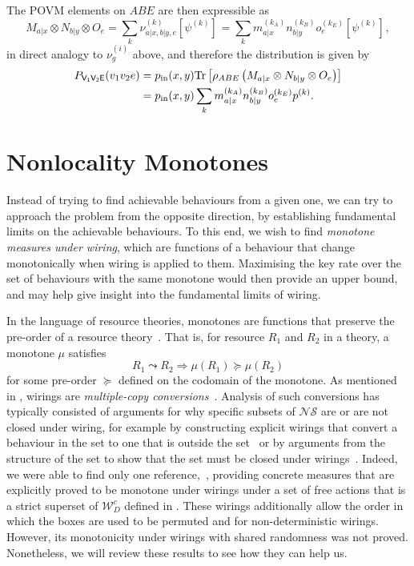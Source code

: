 \documentclass[10pt, a4paper]{article}
\numberwithin{equation}{section} %
\theoremstyle{definition}
\theoremstyle{plain}
\newcommand{\?}{\mathrel{?}} %
\newcommand{\Tr}{\mathrm{Tr}} %
\newcommand{\sW}{\mathcal{W}}
\newcommand{\crv}[1]{\mathsf{#1}}
\newcommand{\proj}[2][]{{[#2]}_{#1}}
\newcommand{\NSs}{\mathcal{NS}}
\begin{document}
    The POVM elements on \(ABE\) are then expressible as
    \begin{equation}
      M_{a|x} \otimes N_{b|y} \otimes O_e = \sum_k \nu^{(k)}_{a|x,b|y,e} \proj{\psi^{(k)}} = \sum_k m_{a|x}^{(k_A)} n_{b|y}^{(k_B)} o_e^{(k_E)} \proj{\psi^{(k)}},
    \end{equation}
    in direct analogy to \(\nu_{g}^{(i)}\) above, and therefore the distribution is given by
    \begin{align}
      P_{\crv{V_1V_2E}}(v_1v_2e) &= p_{\rm in}(x,y) \Tr\left[\rho_{ABE} \left(M_{a|x} \otimes N_{b|y} \otimes O_e\right)\right] \\
                                 &= p_{\rm in}(x,y) \sum_k m_{a|x}^{(k_A)} n_{b|y}^{(k_B)} o_e^{(k_E)} p^{(k)}.
    \end{align}

    \section{Nonlocality Monotones}\label{sec:nlmono}

    Instead of trying to find achievable behaviours from a given one, we can try to approach the problem from the opposite direction, by establishing fundamental limits on the achievable behaviours. To this end, we wish to find \emph{monotone measures under wiring}, which are functions of a behaviour that change monotonically when wiring is applied to them. Maximising the key rate over the set of behaviours with the same monotone would then provide an upper bound, and may help give insight into the fundamental limits of wiring.

    In the language of resource theories, monotones are functions that preserve the pre-order of a resource theory~\cite{BellResourceTheory}. That is, for resource \(R_1\) and \(R_2\) in a theory, a monotone \(\mu\) satisfies
    \begin{equation}
      R_1 \leadsto R_2 \Rightarrow \mu(R_1) \succeq \mu(R_2)
    \end{equation}
    for some pre-order \(\succeq\) defined on the codomain of the monotone. As mentioned in , wirings are \emph{multiple-copy conversions}~\cite{BellResourceTheory}. Analysis of such conversions has typically consisted of arguments for why specific subsets of \(\NSs\) are or are not closed under wiring, for example by constructing explicit wirings that convert a behaviour in the set to one that is outside the set~\cite{ClosedCorrSets} or by arguments from the structure of the set to show that the set must be closed under wirings~\cite{NonlocalZoo}. Indeed, we were able to find only one reference,~\cite{NLMonotones}, providing concrete measures that are explicitly proved to be monotone under wirings under a set of free actions that is a strict superset of \(\sW_D^c\) defined in . These wirings additionally allow the order in which the boxes are used to be permuted and for non-deterministic wirings. However, its monotonicity under wirings with shared randomness was not proved. Nonetheless, we will review these results to see how they can help us.
\end{document}
